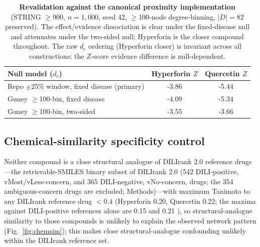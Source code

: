 \begin{table}[ht]
\centering
\caption{\textbf{Revalidation against the canonical proximity implementation} (STRING $\geq$900, $n=1{,}000$, seed 42, $\geq$100-node degree-binning, $|D|=82$ preserved). The effect/evidence dissociation is clear under the fixed-disease null and attenuates under the two-sided null; Hyperforin is the closer compound throughout. The raw $d_c$ ordering (Hyperforin closer) is invariant across all constructions; the $Z$-score evidence difference is null-dependent.}
\label{tab:guney}
\begin{tabular}{@{}l S[table-format=-1.2] S[table-format=-1.2]@{}}
\toprule
\textbf{Null model ($d_c$)} & {\textbf{Hyperforin $Z$}} & {\textbf{Quercetin $Z$}} \\
\midrule
Repo $\pm$25\% window, fixed disease (primary) & -3.86 & -5.44 \\
Guney $\geq$100-bin, fixed disease & -4.09 & -5.34 \\
Guney $\geq$100-bin, two-sided & -3.55 & -3.66 \\
\bottomrule
\end{tabular}
\end{table}


\subsection{Chemical-similarity specificity control}
\label{subsec:chemsim}

Neither compound is a close structural analogue of DILIrank 2.0 reference drugs \citep{Chen2016, Olubamiwa2025}---the retrievable-SMILES binary subset of DILIrank 2.0 (542 DILI-positive, vMost/vLess-concern, and 365 DILI-negative, vNo-concern, drugs; the 354 ambiguous-concern drugs are excluded; Methods)---with maximum Tanimoto to any DILIrank reference drug $<0.4$ (Hyperforin 0.20, Quercetin 0.22; the maxima against DILI-positive references alone are 0.15 and 0.21 \citep{Maggiora2014}), so structural-analogue similarity to those compounds is unlikely to explain the observed network pattern (Fig.~\ref{fig:chemsim}); this makes close structural-analogue confounding unlikely within the DILIrank reference set.
